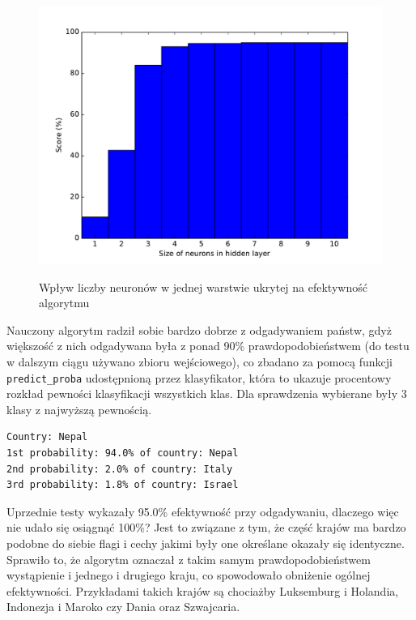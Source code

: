 \begin{figure}[h!]
	\centering
	\includegraphics[width=0.95\linewidth]{hidden_sizes.pdf}
	\label{hidden_sizes}
	\caption{Wpływ liczby neuronów w jednej warstwie ukrytej na efektywność algorytmu}
\end{figure}

\newpage

Nauczony algorytm radził sobie bardzo dobrze z odgadywaniem państw, gdyż większość z nich odgadywana była z ponad 90\% prawdopodobieństwem (do testu w dalszym ciągu używano zbioru wejściowego), co zbadano za pomocą funkcji \texttt{predict\_proba} udostępnioną przez klasyfikator, która to ukazuje procentowy rozkład pewności klasyfikacji wszystkich klas. Dla sprawdzenia wybierane były 3 klasy z najwyższą pewnością.

\begin{lstlisting}[caption=Przykładowy rozkład pewności klas dla poprawnego wskazania państwa Nepal]
Country: Nepal
1st probability: 94.0% of country: Nepal
2nd probability: 2.0% of country: Italy
3rd probability: 1.8% of country: Israel
\end{lstlisting}

Uprzednie testy wykazały 95.0\% efektywność przy odgadywaniu, dlaczego więc nie udało się osiągnąć 100\%? Jest to związane z tym, że część krajów ma bardzo podobne do siebie flagi i cechy jakimi były one określane okazały się identyczne. Sprawiło to, że algorytm oznaczał z takim samym prawdopodobieństwem wystąpienie i jednego i drugiego kraju, co spowodowało obniżenie ogólnej efektywności. Przykładami takich krajów są chociażby Luksemburg i Holandia, Indonezja i Maroko czy Dania oraz Szwajcaria.

